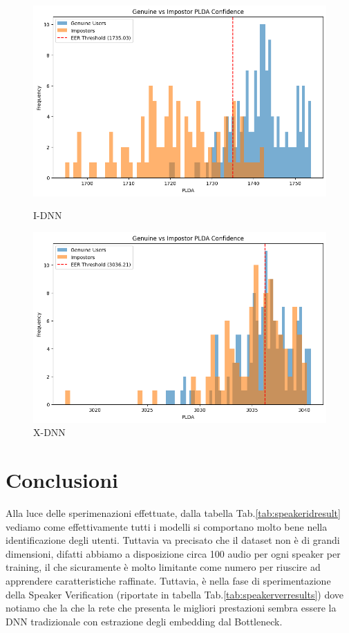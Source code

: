 \begin{figure}[ht]
    \begin{minipage}{0.47\textwidth}
        \centering
        \includegraphics[width=\textwidth]{./ch4/idnn.png}
        \caption{I-DNN}
    \end{minipage}
    \begin{minipage}{0.47\textwidth}
        \centering
        \includegraphics[width=\textwidth]{./ch4/xdnn.png}
        \caption{X-DNN}
    \end{minipage}
\end{figure}


\clearpage

\section{Conclusioni}
Alla luce delle sperimenazioni effettuate, dalla tabella Tab.\ref{tab:speakeridresult} vediamo come effettivamente
tutti i modelli si comportano molto bene nella identificazione degli utenti. Tuttavia va precisato che il dataset non è
di grandi dimensioni, difatti abbiamo a disposizione circa 100 audio per ogni speaker per training, il che sicuramente è molto limitante come numero
per riuscire ad apprendere caratteristiche raffinate. 
Tuttavia, è nella fase di sperimentazione della Speaker Verification (riportate in tabella Tab.\ref{tab:speakerverresults}) dove notiamo che la 
che la rete che presenta le migliori prestazioni sembra essere la DNN tradizionale con estrazione degli embedding dal Bottleneck.

